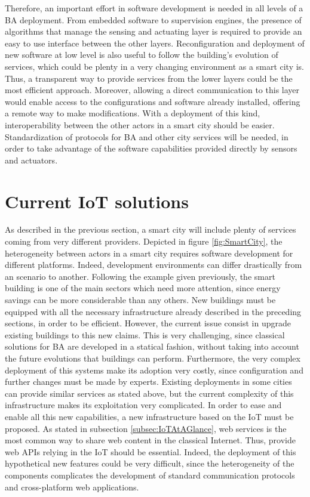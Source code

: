 Therefore, an important effort in software development is needed in all levels of a BA deployment.
From embedded software to supervision engines, the presence of algorithms that manage the sensing and actuating layer is required to provide an easy to use interface between the other layers.
Reconfiguration and deployment of new software at low level is also useful to follow the building's evolution of services, which could be plenty in a very changing environment as a smart city is.
Thus, a transparent way to provide services from the lower layers could be the most efficient approach.
Moreover, allowing a direct communication to this layer would enable access to the configurations and software already installed, offering a remote way to make modifications.
With a deployment of this kind, interoperability between the other actors in a smart city should be easier.
Standardization of protocols for BA and other city services will be needed, in order to take advantage of the software capabilities provided directly by sensors and actuators.

\section{Current IoT solutions}
As described in the previous section, a smart city will include plenty of services coming from very different providers.
Depicted in figure \ref{fig:SmartCity}, the heterogeneity between actors in a smart city requires software development for different platforms.
Indeed, development environments can differ drastically from an scenario to another.
Following the example given previously, the smart building is one of the main sectors which need more attention, since energy savings can be more considerable than any others.
New buildings must be equipped with all the necessary infrastructure already described in the preceding sections, in order to be efficient.
However, the current issue consist in upgrade existing buildings to this new claims.
This is very challenging, since classical solutions for BA are developed in a statical fashion, without taking into account the future evolutions that buildings can perform.
Furthermore, the very complex deployment of this systems make its adoption very costly, since configuration and further changes must be made by experts.
Existing deployments in some cities can provide similar services as stated above, but the current complexity of this infrastructure makes its exploitation very complicated.
In order to ease and enable all this new capabilities, a new infrastructure based on the IoT must be proposed.
As stated in subsection \ref{subsec:IoTAtAGlance}, web services is the most common way to share web content in the classical Internet.
Thus, provide web APIs relying in the IoT should be essential.
Indeed, the deployment of this hypothetical new features could be very difficult, since the heterogeneity of the components complicates the development of standard communication protocols and cross-platform web applications.



